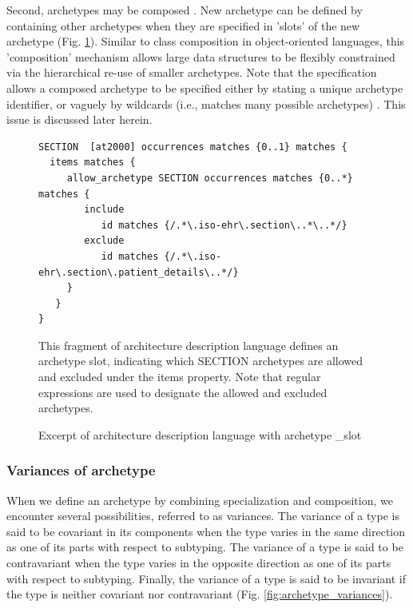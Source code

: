 \documentclass[preprint,3p,onecolumn,times,review]{elsarticle}
\begin{document}
Second, archetypes may be composed \cite[ix]{iso08:13606_healt_elect_part2}. New archetype can be defined by containing other archetypes when they are specified in 'slots' of the new archetype (Fig. \ref{archetype_slot_regex}).
Similar to class composition in object-oriented languages, this 'composition' mechanism allows large data structures to be flexibly constrained via the hierarchical re-use of smaller archetypes. \cite{beale08:_openeh_archit_overv,beale07:_archet_objec_model}
Note that the specification allows a composed archetype to be specified either by stating a unique archetype identifier, or vaguely by wildcards (i.e., matches many possible archetypes) \cite[p.61]{beale07:_archet_defin_languag}. This issue is discussed later herein.

\begin{figure}[!htbp]
\begin{verbatim}
SECTION  [at2000] occurrences matches {0..1} matches {
  items matches {
     allow_archetype SECTION occurrences matches {0..*} matches {
        include
           id matches {/.*\.iso-ehr\.section\..*\..*/}
        exclude
           id matches {/.*\.iso-ehr\.section\.patient_details\..*/}
     }
   }
}
\end{verbatim}
  \caption{Excerpt of architecture description language with archetype \_slot}\label{archetype_slot_regex}
  This fragment of architecture description language defines an archetype slot, indicating which SECTION archetypes are allowed and excluded under the items property.
  Note that regular expressions are used to designate the allowed and excluded archetypes.
\end{figure}


\subsubsection{Variances of archetype \label{sec:variances_archetype}}

When we define an archetype by combining specialization and composition, we encounter several possibilities, referred to as variances. The variance of a type is said to be covariant in its components when the type varies in the same direction as one of its parts with respect to subtyping. The variance of a type is said to be contravariant when the type varies in the opposite direction as one of its parts with respect to subtyping. Finally, the variance of a type is said to be invariant if the type is neither covariant nor contravariant (Fig. \ref{fig:archetype_variances}).
\end{document}
